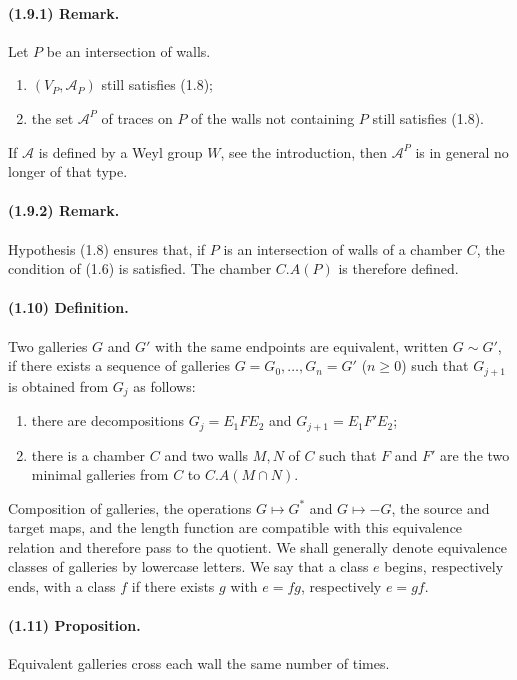 \documentclass[10pt]{article}
\newcommand{\mcA}{\mathcal A}
\begin{document}
\paragraph{(1.9.1) Remark.} Let $P$ be an intersection of walls.
\begin{enumerate}[label=(\roman*)]
\item $(V_P,\mcA_P)$ still satisfies (1.8);
\item the set $\mcA^P$ of traces on $P$ of the walls not containing $P$ still satisfies (1.8).
\end{enumerate}
If $\mcA$ is defined by a Weyl group $W$, see the introduction, then $\mcA^P$ is in general no longer of that type.

\paragraph{(1.9.2) Remark.} Hypothesis (1.8) ensures that, if $P$ is an intersection of walls of a chamber $C$, the condition of (1.6) is satisfied. The chamber $C.A(P)$ is therefore defined.

\paragraph{(1.10) Definition.} Two galleries $G$ and $G'$ with the same endpoints are equivalent, written $G\sim G'$, if there exists a sequence of galleries $G=G_0,\ldots,G_n=G'$ ($n\ge0$) such that $G_{j+1}$ is obtained from $G_j$ as follows:
\begin{enumerate}[label=\alph*)]
\item there are decompositions $G_j=E_1FE_2$ and $G_{j+1}=E_1F'E_2$;
\item there is a chamber $C$ and two walls $M,N$ of $C$ such that $F$ and $F'$ are the two minimal galleries from $C$ to $C.A(M\cap N)$.
\end{enumerate}
Composition of galleries, the operations $G\mapsto G^*$ and $G\mapsto -G$, the source and target maps, and the length function are compatible with this equivalence relation and therefore pass to the quotient. We shall generally denote equivalence classes of galleries by lowercase letters. We say that a class $e$ begins, respectively ends, with a class $f$ if there exists $g$ with $e=fg$, respectively $e=gf$.

\paragraph{(1.11) Proposition.} Equivalent galleries cross each wall the same number of times.
\end{document}

